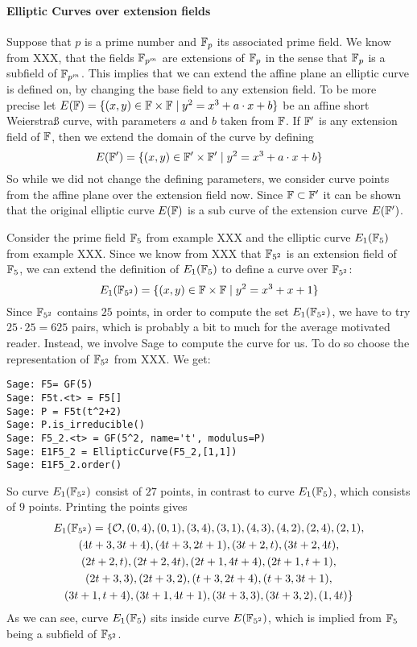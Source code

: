 \paragraph{Elliptic Curves over extension fields} Suppose that $p$ is a prime number and $\mathbb{F}_p$ its associated prime field. We know from XXX, that the fields $\mathbb{F}_{p^m}$ are extensions of $\mathbb{F}_p$ in the sense that $\mathbb{F}_{p}$ is a subfield of $\mathbb{F}_{p^m}$. This implies that we can extend the affine plane an elliptic curve is defined on, by changing the base field to any extension field. To be more precise let 
$E(\mathbb{F})=\{ (x,y)\in \mathbb{F} \times \mathbb{F} \;|\; y^2 = x^3 +a\cdot x +b \}$ be an affine short Weierstraß curve, with parameters $a$ and $b$ taken from $\mathbb{F}$. If $\mathbb{F}'$ is any extension field of $\mathbb{F}$, then we extend the domain of the curve by defining
\begin{equation}
E(\mathbb{F}')=\{ (x,y)\in \mathbb{F}' \times \mathbb{F}' \;|\; y^2 = x^3 +a\cdot x +b \}
\end{equation}   
So while we did not change the defining parameters, we consider curve points from the affine plane over the extension field now. Since $\mathbb{F}\subset \mathbb{F}'$ it can be shown that the original elliptic curve $E(\mathbb{F})$ is a sub curve of the extension curve $E(\mathbb{F}')$.
\begin{example} Consider the prime field $\mathbb{F}_5$ from example XXX and the elliptic curve $E_1(\mathbb{F}_5)$ from example XXX. Since we know from XXX that $\mathbb{F}_{5^2}$ is an extension field of $\mathbb{F}_5$, we can extend the definition of $E_1(\mathbb{F}_5)$ to define a curve over $\mathbb{F}_{5^2}$:
$$
E_1(\mathbb{F}_{5^2}) = \{ (x,y)\in \mathbb{F}\times \mathbb{F} \;|\; y^2 = x^3 + x +1 \}
$$
Since $\mathbb{F}_{5^2}$ contains $25$ points, in order to compute the set $E_1(\mathbb{F}_{5^2})$, we have to try $25\cdot 25 = 625$ pairs, which is probably a bit to much for the average motivated reader. Instead, we involve Sage to compute the curve for us. To do so choose the representation of $\mathbb{F}_{5^2}$ from XXX. We get:
\begin{verbatim}
Sage: F5= GF(5)
Sage: F5t.<t> = F5[] 
Sage: P = F5t(t^2+2)
Sage: P.is_irreducible()
Sage: F5_2.<t> = GF(5^2, name='t', modulus=P)
Sage: E1F5_2 = EllipticCurve(F5_2,[1,1])
Sage: E1F5_2.order()
\end{verbatim}
So curve $E_1(\mathbb{F}_{5^2})$ consist of $27$ points, in contrast to curve $E_1(\mathbb{F}_{5})$, which consists of $9$ points. Printing the points gives
\begin{multline*}
E_1(\mathbb{F}_{5^2}) = \{\mathcal{O}, (0, 4), (0, 1), (3, 4), (3, 1), (4, 3), (4, 2), (2, 4), (2, 1),\\ 
(4t + 3, 3t + 4), (4t + 3, 2t + 1),  (3t + 2, t), (3t + 2, 4t),\\ 
(2t + 2, t), (2t + 2, 4t), (2t + 1, 4t + 4), (2t + 1, t + 1),\\ 
(2t + 3, 3), (2t + 3, 2), (t + 3, 2t + 4), (t + 3, 3t + 1),\\ 
(3t + 1, t + 4), (3t + 1, 4t + 1), (3t + 3, 3), (3t + 3, 2), (1, 4t)
\}
\end{multline*}
As we can see, curve $E_1(\mathbb{F}_5)$ sits inside curve $E(\mathbb{F}_{5^2})$, which is implied from $\mathbb{F}_5$ being a subfield of $\mathbb{F}_{5^2}$.
\end{example}
